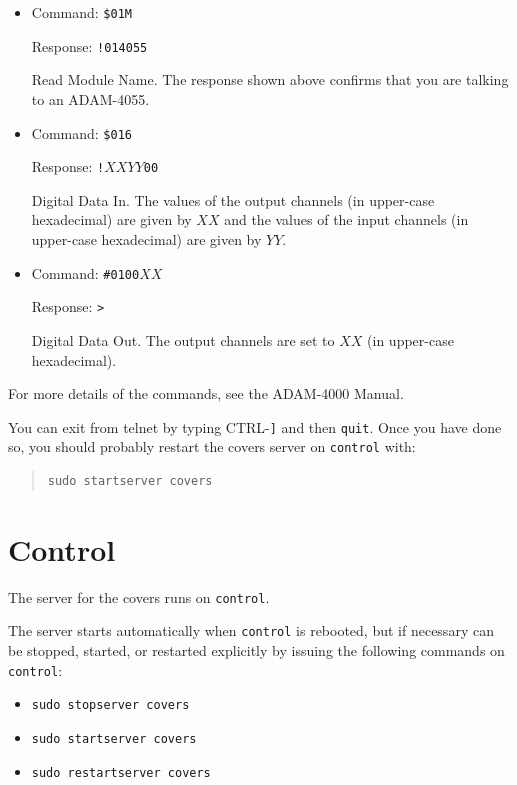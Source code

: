 \begin{itemize}
\item Command: \verb|$01M|

Response: \verb|!014055|

Read Module Name. The response shown above confirms that you are talking to an ADAM-4055.

\item 
Command: \verb|$016|

Response: \verb|!|$XXYY$\verb|00|

Digital Data In. The values of the output channels (in upper-case hexadecimal) are given by $XX$ and the values of the input channels (in upper-case hexadecimal) are given by $YY$.

\item 
Command: \verb|#0100|$XX$

Response: \verb|>|

Digital Data Out. The output channels are set to $XX$ (in upper-case hexadecimal).

\end{itemize}

For more details of the commands, see the ADAM-4000 Manual.

You can exit from telnet by typing CTRL-\verb|]| and then \verb|quit|. Once you have done so, you should probably restart the covers server on \verb|control| with:

\begin{quotation}
\begin{verbatim}
sudo startserver covers
\end{verbatim}
\end{quotation}

\section{Control}

The server for the covers runs on \verb|control|. 

The server starts automatically when \verb|control| is rebooted, but if necessary can be stopped, started, or restarted explicitly by issuing the following commands on \verb|control|:
\begin{itemize}
\item
\verb|sudo stopserver covers|
\item
\verb|sudo startserver covers|
\item
\verb|sudo restartserver covers|
\end{itemize}

